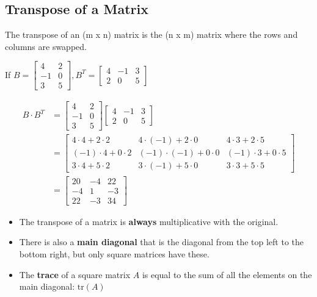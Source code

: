 \documentclass[
  letterpaper,
  DIV=11,
  numbers=noendperiod]{scrartcl}
\providecommand{\tightlist}{%
  \setlength{\itemsep}{0pt}\setlength{\parskip}{0pt}}\usepackage{longtable,booktabs,array}
\begin{document}
\hypertarget{transpose-of-a-matrix}{%
\subsection{Transpose of a Matrix}\label{transpose-of-a-matrix}}

The transpose of an (m x n) matrix is the (n x m) matrix where the rows
and columns are swapped.

If
\(B = \begin{bmatrix} 4 & 2 \\ -1 & 0 \\ 3 & 5 \end{bmatrix}, B^T = \begin{bmatrix} 4 & -1 & 3 \\ 2 & 0 & 5 \end{bmatrix}\)

\begin{align*}
B \cdot B^T &= \begin{bmatrix} 4 & 2 \\ -1 & 0 \\ 3 & 5 \end{bmatrix} \begin{bmatrix} 4 & -1 & 3 \\ 2 & 0 & 5 \end{bmatrix} \\ 
&= \begin{bmatrix} 4 \cdot 4 + 2 \cdot 2 & 4 \cdot (-1) + 2 \cdot 0 & 4 \cdot 3 + 2 \cdot 5 \\ (-1) \cdot 4 + 0 \cdot 2 & (-1) \cdot (-1) + 0 \cdot 0 & (-1) \cdot 3 + 0 \cdot 5 \\ 3 \cdot 4 + 5 \cdot 2 & 3 \cdot (-1) + 5 \cdot 0 & 3 \cdot 3 + 5 \cdot 5 \end{bmatrix} \\ 
&= \begin{bmatrix} 20 & -4 & 22 \\ -4 & 1 & -3 \\ 22 & -3 & 34\end{bmatrix}
\end{align*}

\begin{itemize}
\tightlist
\item
  The transpose of a matrix is \textbf{always} multiplicative with the
  original.
\item
  There is also a \textbf{main diagonal} that is the diagonal from the
  top left to the bottom right, but only square matrices have these.
\item
  The \textbf{trace} of a square matrix \(A\) is equal to the sum of all
  the elements on the main diagonal: \(\mathrm{tr}(A)\)
\end{itemize}
\end{document}
